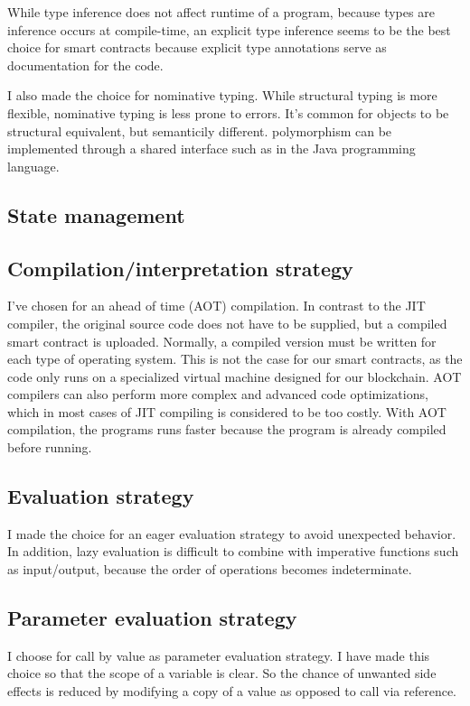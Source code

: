 \documentclass{uva-inf-article}
\begin{document}
\par While type inference does not affect runtime of a program, because types are inference occurs at compile-time,
an explicit type inference seems to be the best choice for smart contracts because  
explicit type annotations serve as documentation for the code.

\par I also made the choice for nominative typing. 
While structural typing is more flexible, nominative typing is less prone to errors.
It's common for objects to be structural equivalent, but semanticily different.
polymorphism can be implemented through a shared interface such as in the Java programming language.

\subsection{State management}
\par 

\subsection{Compilation/interpretation strategy}
\par I've chosen for an ahead of time (AOT) compilation. In contrast to the JIT compiler, 
the original source code does not have to be supplied, but a compiled smart contract is uploaded.
Normally, a compiled version must be written for each type of operating system. 
This is not the case for our smart contracts, as the code only runs on a specialized virtual machine 
designed for our blockchain. AOT compilers can also perform more complex and advanced code optimizations,
which in most cases of JIT compiling is considered to be too costly.
With AOT compilation, the programs runs faster because the program is already compiled before running.

\subsection{Evaluation strategy}
I made the choice for an eager evaluation strategy to avoid unexpected behavior.
In addition, lazy evaluation is difficult to combine with imperative functions such as 
input/output, because the order of operations becomes indeterminate.

\subsection{Parameter evaluation strategy}
I choose for call by value as parameter evaluation strategy. 
I have made this choice so that the scope of a variable is clear. 
So the chance of unwanted side effects is reduced by modifying a copy of a value as opposed to call via reference.
\end{document}
